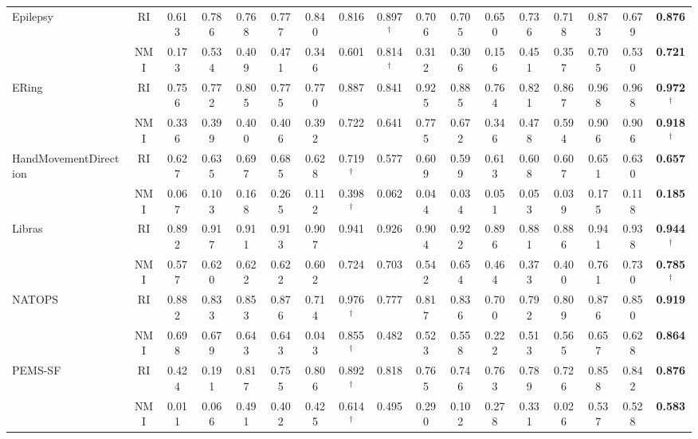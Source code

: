 \documentclass{article}
\begin{document}
\begin{table*}[h]
{\begin{tabular}{lcccccccc|cccccccc}
\multirow{2}{*}{Epilepsy} & RI & 0.613	& 0.786 &  	0.768 &	0.777 &	0.840  & 0.816 &	0.897$^\dag$ & 0.706 &	0.705 &	0.650 &	0.736 &	0.718 & 0.873  &	0.679    & \textbf{0.876}   \\
                                           & NMI & 0.173	& 0.534 &  	0.409 &	0.471 &	0.346  &	0.601 &	0.814$^\dag$ & 0.312 &	0.306 &	0.156 &	0.451 &	0.357 & 0.705  & 0.530  & \textbf{0.721}    \\
\multirow{2}{*}{ERing} & RI	& 0.756 & 0.772 &  	0.805 &	0.775 &	0.770  &	0.887  & 0.841  & 0.925 &	0.885 &	0.764 &	0.821 &	0.867 & 0.968  &	0.968  & \textbf{0.972}$^\dag$  \\
                                           & NMI & 0.336	& 0.399 &  	0.400 &	0.406 &	0.392  &	0.722 &	0.641 &0.775 &	0.672 &	0.346 &	0.478 &	0.594 &	0.906 & 0.906 & \textbf{0.918}$^\dag$   \\
\multirow{2}{*}{HandMovementDirection} & RI & 0.627	& 0.635 &  	0.697 & 0.685 &	0.628  &	0.719$^\dag$ & 0.577 & 0.609 	& 0.599 & 0.613 &	0.608 &	0.607 & 0.651 &	0.630 & \textbf{0.657} \\
                                           & NMI & 0.067	& 0.103 &  	0.168 &	0.265 &	0.112  &	0.398$^\dag$ & 0.062 &	0.044 &	0.034 &	0.051 &	0.053 &	0.039 &	0.175 & 0.118  &	\textbf{0.185} \\
\multirow{2}{*}{Libras} & RI & 0.892 	& 0.917 &  	0.911 &	0.913 &	0.907  &	0.941 &	0.926 & 0.904 &	0.922 &	0.896 &	0.881 &	0.886 & 0.941 &	0.938 & \textbf{0.944}$^\dag$ \\
                                           & NMI	& 0.577 & 0.620 &  	0.622 &	0.622 &	0.602  &	0.724 &	0.703 & 0.542 & 0.654 &	0.464 &	0.373 &	0.400 &	0.761 & 0.730 & \textbf{0.785}$^\dag$    \\
\multirow{2}{*}{NATOPS} & RI & 0.882	& 0.833 &  	0.853 &	0.876 &	0.714  &	0.976$^\dag$ & 0.777 &	0.817 &	0.836 &	0.700 &	0.792 &	0.809 &	0.876 &	0.850  &  \textbf{0.919}    \\
                                           & NMI & 0.698	& 0.679 &  	0.643 &	0.643 &	0.043  &	0.855$^\dag$ & 0.482 &	0.523 &	0.558 &	0.222 &	0.513 &	0.565 &	0.657 &	0.628   & \textbf{0.864} \\
\multirow{2}{*}{PEMS-SF} & RI & 0.424	& 0.191 &  	0.817 &	0.755 &	0.806  &	0.892$^\dag$ & 0.818 &	0.765 &	0.746 &	0.763 &	0.789 &	0.726 &	0.858 & 0.842 & \textbf{0.876}     \\
                                           & NMI & 0.011	& 0.066 &  	0.491 &	0.402 &	0.425  &	0.614$^\dag$ & 0.495	& 0.290 &	0.102 & 0.278 &	0.331 &	0.026 &	0.537 & 0.528 &  \textbf{0.583} \\

\end{tabular}}
\end{table*}
\end{document}
